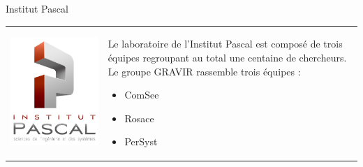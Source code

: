 \documentclass{beamer}
\begin{document}
\begin{frame}{Institut Pascal}
  \begin{tabular}{l l}
    \begin{minipage}{0.3\linewidth}
      \includegraphics[width=\linewidth]{images/logo-IP.jpg}
    \end{minipage}
    &
    \begin{minipage}{0.7\linewidth}
      Le laboratoire de l'Institut Pascal est composé de trois équipes regroupant au total une centaine de chercheurs. Le groupe GRAVIR %
      rassemble trois équipes :
      \begin{itemize}
      \item ComSee %
      \item Rosace %
      \item PerSyst %
      \end{itemize}
    \end{minipage}
  \end{tabular}
\end{frame}
\end{document}
